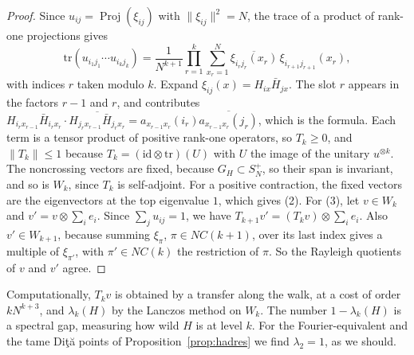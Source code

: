 \documentclass[11pt]{amsart}
\theoremstyle{definition}
\theoremstyle{remark}
\theoremstyle{plain}
\numberwithin{equation}{section}
\numberwithin{table}{section}
\DeclareMathOperator{\Proj}{Proj}
\begin{document}
\begin{proof}
Since $u_{ij}=\Proj(\xi_{ij})$ with $\|\xi_{ij}\|^2=N$, the trace of a product of rank-one projections gives
\[
\mathrm{tr}(u_{i_1j_1}\cdots u_{i_kj_k})=\frac{1}{N^{k+1}}\prod_{r=1}^k\sum_{x_r=1}^N\overline{\xi_{i_rj_r}(x_r)}\,\xi_{i_{r+1}j_{r+1}}(x_r),
\]
with indices $r$ taken modulo $k$. Expand $\xi_{ij}(x)=H_{ix}\bar H_{jx}$. The slot $r$ appears in the factors $r-1$ and $r$, and contributes $H_{i_rx_{r-1}}\bar H_{i_rx_r}\cdot\overline{H_{j_rx_{r-1}}\bar H_{j_rx_r}}=a_{x_{r-1}x_r}(i_r)\overline{a_{x_{r-1}x_r}(j_r)}$, which is the formula. Each term is a tensor product of positive rank-one operators, so $T_k\ge0$, and $\|T_k\|\le1$ because $T_k=(\mathrm{id}\otimes\mathrm{tr})(U)$ with $U$ the image of the unitary $u^{\otimes k}$. The noncrossing vectors are fixed, because $G_H\subset S_N^+$, so their span is invariant, and so is $W_k$, since $T_k$ is self-adjoint. For a positive contraction, the fixed vectors are the eigenvectors at the top eigenvalue $1$, which gives (2). For (3), let $v\in W_k$ and $v'=v\otimes\sum_ie_i$. Since $\sum_ju_{ij}=1$, we have $T_{k+1}v'=(T_kv)\otimes\sum_ie_i$. Also $v'\in W_{k+1}$, because summing $\xi_\pi$, $\pi\in NC(k+1)$, over its last index gives a multiple of $\xi_{\pi'}$, with $\pi'\in NC(k)$ the restriction of $\pi$. So the Rayleigh quotients of $v$ and $v'$ agree.
\end{proof}

Computationally, $T_kv$ is obtained by a transfer along the walk, at a cost of order $kN^{k+3}$, and $\lambda_k(H)$ by the Lanczos method on $W_k$. The number $1-\lambda_k(H)$ is a spectral gap, measuring how wild $H$ is at level $k$. For the Fourier-equivalent and the tame Di{\c t}{\u a} points of Proposition~\ref{prop:hadres} we find $\lambda_2=1$, as we should.
\end{document}
